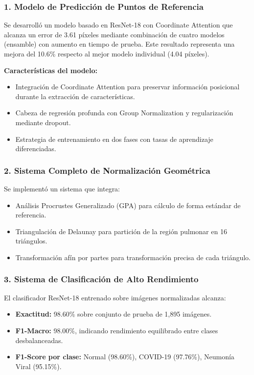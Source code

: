 \subsubsection{1. Modelo de Predicción de Puntos de Referencia}

Se desarrolló un modelo basado en ResNet-18 con Coordinate Attention que alcanza un error de 3.61 píxeles mediante combinación de cuatro modelos (ensamble) con aumento en tiempo de prueba. Este resultado representa una mejora del 10.6\% respecto al mejor modelo individual (4.04 píxeles).

\textbf{Características del modelo:}
\begin{itemize}
    \item Integración de Coordinate Attention para preservar información posicional durante la extracción de características.
    \item Cabeza de regresión profunda con Group Normalization y regularización mediante dropout.
    \item Estrategia de entrenamiento en dos fases con tasas de aprendizaje diferenciadas.
\end{itemize}

\subsubsection{2. Sistema Completo de Normalización Geométrica}

Se implementó un sistema que integra:
\begin{itemize}
    \item Análisis Procrustes Generalizado (GPA) para cálculo de forma estándar de referencia.
    \item Triangulación de Delaunay para partición de la región pulmonar en 16 triángulos.
    \item Transformación afín por partes para transformación precisa de cada triángulo.
\end{itemize}

\subsubsection{3. Sistema de Clasificación de Alto Rendimiento}

El clasificador ResNet-18 entrenado sobre imágenes normalizadas alcanza:
\begin{itemize}
    \item \textbf{Exactitud:} 98.60\% sobre conjunto de prueba de 1,895 imágenes.
    \item \textbf{F1-Macro:} 98.00\%, indicando rendimiento equilibrado entre clases desbalanceadas.
    \item \textbf{F1-Score por clase:} Normal (98.60\%), COVID-19 (97.76\%), Neumonía Viral (95.15\%).
\end{itemize}

